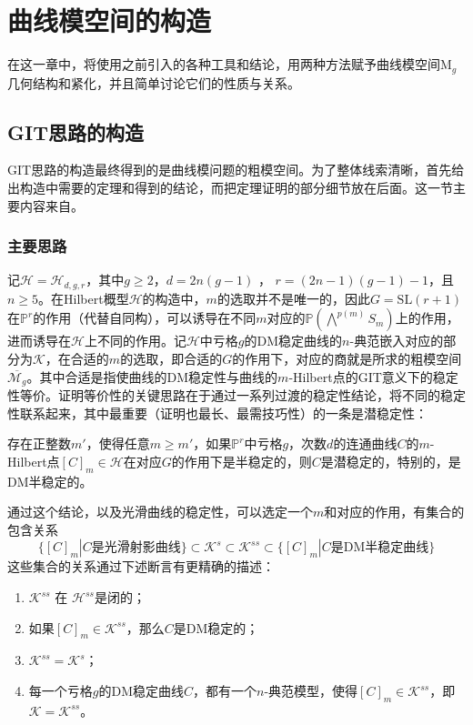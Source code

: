 \chapter{曲线模空间的构造}
在这一章中，将使用之前引入的各种工具和结论，用两种方法赋予曲线模空间$ \mathrm{M}_g $几何结构和紧化，并且简单讨论它们的性质与关系。
\section{GIT思路的构造}
GIT思路的构造最终得到的是曲线模问题的粗模空间。为了整体线索清晰，首先给出构造中需要的定理和得到的结论，而把定理证明的部分细节放在后面。这一节主要内容来自\cite{ModuliofCurves,LecturesonModuliofCurves}。
\subsection{主要思路}
记$ \mathcal{H}=\mathcal{H}_{d,g,r} $，其中$ g\geqslant2 $，$ d=2n(g-1)$ ， $r=(2n-1)(g-1)-1 $，且$ n\geqslant 5 $。在Hilbert概型$ \mathcal{H} $的构造中，$ m $的选取并不是唯一的，因此$ G=\mathrm{SL}(r+1) $在$ \mathbb{P}^r $的作用（代替自同构），可以诱导在不同$ m $对应的$ \mathbb{P}(\bigwedge^{p(m)}S_m) $上的作用，进而诱导在$ \mathcal{H} $上不同的作用。记$ \mathcal{H} $中亏格$ g $的DM稳定曲线的$ n $-典范嵌入对应的部分为$ \mathcal{K} $，在合适的$ m $的选取，即合适的$ G $的作用下，对应的商就是所求的粗模空间$ \overline{\mathcal{M}_g} $。其中合适是指使曲线的DM稳定性与曲线的$ m $-Hilbert点的GIT意义下的稳定性等价。证明等价性的关键思路在于通过一系列过渡的稳定性结论，将不同的稳定性联系起来，其中最重要（证明也最长、最需技巧性）的一条是潜稳定性：
\begin{theorem}\label{potentiallystable}	
	存在正整数$ m' $，使得任意$ m\geqslant m' $，如果$ \mathbb{P}^r $中亏格$ g $，次数$ d $的连通曲线$ C $的$ m $-Hilbert点$ [C]_m\in \mathcal{H} $在对应$ G $的作用下是半稳定的，则$ C $是潜稳定的，特别的，是DM半稳定的。
\end{theorem}
通过这个结论，以及光滑曲线的稳定性，可以选定一个$ m $和对应的作用，有集合的包含关系
$$  \{[C]_m|C\text{是光滑射影曲线}\}\subset \mathcal{K}^{s}\subset \mathcal{K}^{ss}\subset \{[C]_m|C\text{是DM半稳定曲线}\} $$
这些集合的关系通过下述断言有更精确的描述：
	\begin{enumerate}
		\item $ \mathcal{K}^{ss}$ 在 $ \mathcal{H}^{ss} $是闭的；
		\item 如果$ [C]_m\in \mathcal{K}^{ss} $，那么$ C $是DM稳定的；
		\item $ \mathcal{K}^{ss}=\mathcal{K}^s $；
		\item 每一个亏格$ g $的DM稳定曲线$ C $，都有一个$ n $-典范模型，使得$ [C]_m\in \mathcal{K}^{ss} $，即$ \mathcal{K}=\mathcal{K}^{ss} $。
	\end{enumerate}

